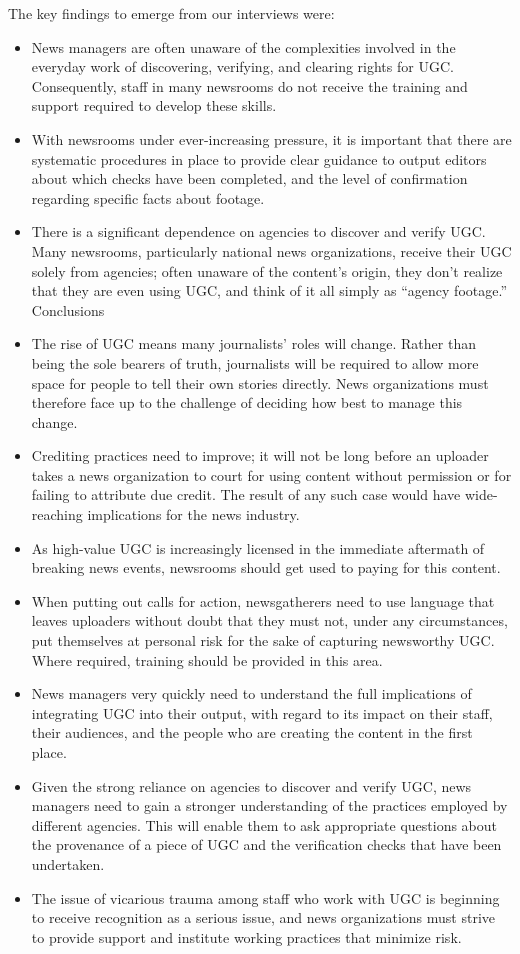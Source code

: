 \begin{enumerate}
The key findings to emerge from our interviews were:
\begin{itemize}
\item News managers are often unaware of the complexities
involved in the everyday work of discovering, verifying, and
clearing rights for UGC. Consequently, staff in many newsrooms
do not receive the training and support required to develop
these skills.
\item With newsrooms under ever-increasing pressure, it is important
that there are systematic procedures in place to provide
clear guidance to output editors about which checks have been
completed, and the level of confirmation regarding specific facts
about footage.
\item There is a significant dependence on agencies to discover and
verify UGC. Many newsrooms, particularly national news organizations,
receive their UGC solely from agencies; often unaware
of the content's origin, they don't realize that they are even using
UGC, and think of it all simply as ``agency footage.''
Conclusions
\item The rise of UGC means many journalists' roles will change.
Rather than being the sole bearers of truth, journalists will be
required to allow more space for people to tell their own stories
directly. News organizations must therefore face up to the challenge
of deciding how best to manage this change.
\item Crediting practices need to improve; it will not be long before
an uploader takes a news organization to court for using content
without permission or for failing to attribute due credit. The
result of any such case would have wide-reaching implications
for the news industry.
\item As high-value UGC is increasingly licensed in the immediate
aftermath of breaking news events, newsrooms should get used
to paying for this content.
\item When putting out calls for action, newsgatherers need to use
language that leaves uploaders without doubt that they must not,
under any circumstances, put themselves at personal risk for the
sake of capturing newsworthy UGC. Where required, training
should be provided in this area.
\item News managers very quickly need to understand the full implications
of integrating UGC into their output, with regard to its
impact on their staff, their audiences, and the people who are
creating the content in the first place.
\item Given the strong reliance on agencies to discover and verify
UGC, news managers need to gain a stronger understanding
of the practices employed by different agencies. This will
enable them to ask appropriate questions about the provenance
of a piece of UGC and the verification checks that have
been undertaken.
\item The issue of vicarious trauma among staff who work with UGC
is beginning to receive recognition as a serious issue, and news
organizations must strive to provide support and institute working
practices that minimize risk.
\end{itemize}


\end{enumerate}
